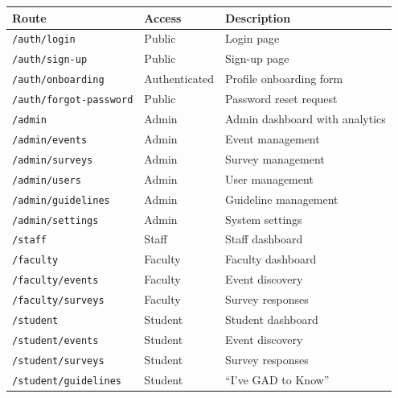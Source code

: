 \documentclass[11pt,a4paper]{article}
\begin{document}
\begin{table}[h!]
\centering
\small
\renewcommand{\arraystretch}{1.3}
\begin{tabular}{|p{4.5cm}|p{3cm}|p{5.5cm}|}
\hline
\textbf{Route} & \textbf{Access} & \textbf{Description} \\ \hline
\texttt{/auth/login} & Public & Login page \\ \hline
\texttt{/auth/sign-up} & Public & Sign-up page \\ \hline
\texttt{/auth/onboarding} & Authenticated & Profile onboarding form \\ \hline
\texttt{/auth/forgot-password} & Public & Password reset request \\ \hline
\texttt{/admin} & Admin & Admin dashboard with analytics \\ \hline
\texttt{/admin/events} & Admin & Event management \\ \hline
\texttt{/admin/surveys} & Admin & Survey management \\ \hline
\texttt{/admin/users} & Admin & User management \\ \hline
\texttt{/admin/guidelines} & Admin & Guideline management \\ \hline
\texttt{/admin/settings} & Admin & System settings \\ \hline
\texttt{/staff} & Staff & Staff dashboard \\ \hline
\texttt{/faculty} & Faculty & Faculty dashboard \\ \hline
\texttt{/faculty/events} & Faculty & Event discovery \\ \hline
\texttt{/faculty/surveys} & Faculty & Survey responses \\ \hline
\texttt{/student} & Student & Student dashboard \\ \hline
\texttt{/student/events} & Student & Event discovery \\ \hline
\texttt{/student/surveys} & Student & Survey responses \\ \hline
\texttt{/student/guidelines} & Student & ``I've GAD to Know'' \\ \hline
\end{tabular}
\end{table}
\end{document}
